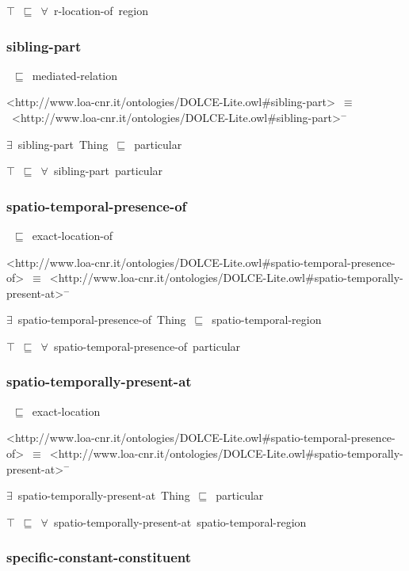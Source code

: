 \documentclass{article}
\begin{document}
\ensuremath{\top}~\ensuremath{\sqsubseteq}~\ensuremath{\forall}~r-location-of~region

\subsubsection*{sibling-part}

~\ensuremath{\sqsubseteq}~mediated-relation

<http://www.loa-cnr.it/ontologies/DOLCE-Lite.owl#sibling-part>~\ensuremath{\equiv}~<http://www.loa-cnr.it/ontologies/DOLCE-Lite.owl#sibling-part>\ensuremath{^-}

\ensuremath{\exists}~sibling-part~Thing~\ensuremath{\sqsubseteq}~particular

\ensuremath{\top}~\ensuremath{\sqsubseteq}~\ensuremath{\forall}~sibling-part~particular

\subsubsection*{spatio-temporal-presence-of}

~\ensuremath{\sqsubseteq}~exact-location-of

<http://www.loa-cnr.it/ontologies/DOLCE-Lite.owl#spatio-temporal-presence-of>~\ensuremath{\equiv}~<http://www.loa-cnr.it/ontologies/DOLCE-Lite.owl#spatio-temporally-present-at>\ensuremath{^-}

\ensuremath{\exists}~spatio-temporal-presence-of~Thing~\ensuremath{\sqsubseteq}~spatio-temporal-region

\ensuremath{\top}~\ensuremath{\sqsubseteq}~\ensuremath{\forall}~spatio-temporal-presence-of~particular

\subsubsection*{spatio-temporally-present-at}

~\ensuremath{\sqsubseteq}~exact-location

<http://www.loa-cnr.it/ontologies/DOLCE-Lite.owl#spatio-temporal-presence-of>~\ensuremath{\equiv}~<http://www.loa-cnr.it/ontologies/DOLCE-Lite.owl#spatio-temporally-present-at>\ensuremath{^-}

\ensuremath{\exists}~spatio-temporally-present-at~Thing~\ensuremath{\sqsubseteq}~particular

\ensuremath{\top}~\ensuremath{\sqsubseteq}~\ensuremath{\forall}~spatio-temporally-present-at~spatio-temporal-region

\subsubsection*{specific-constant-constituent}
\end{document}
